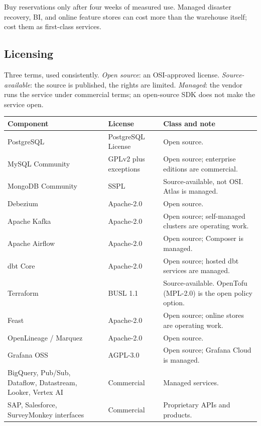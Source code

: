 \documentclass[10pt,a4paper]{article}
\begin{document}
Buy reservations only after four weeks of measured use. Managed
disaster recovery, BI, and online feature stores can cost more than the
warehouse itself; cost them as first-class services.

\subsection{Licensing}

Three terms, used consistently. \emph{Open source}: an OSI-approved
license. \emph{Source-available}: the source is published, the rights
are limited. \emph{Managed}: the vendor runs the service under
commercial terms; an open-source SDK does not make the service open.

{\small
\begin{tabularx}{\textwidth}{L{44mm}L{38mm}Y}
\toprule
\textbf{Component} & \textbf{License} & \textbf{Class and note} \\
\midrule
PostgreSQL & PostgreSQL License & Open source.\cite{postgresLicense} \\
MySQL Community & GPLv2 plus exceptions & Open source; enterprise editions are commercial.\cite{mysqlLicense} \\
MongoDB Community & SSPL & Source-available, not OSI. Atlas is managed.\cite{mongoSSPL} \\
Debezium & Apache-2.0 & Open source.\cite{debeziumLicense} \\
Apache Kafka & Apache-2.0 & Open source; self-managed clusters are operating work.\cite{kafkaLicense} \\
Apache Airflow & Apache-2.0 & Open source; Composer is managed.\cite{airflowLicense} \\
dbt Core & Apache-2.0 & Open source; hosted dbt services are managed.\cite{dbtLicense} \\
Terraform & BUSL 1.1 & Source-available. OpenTofu (MPL-2.0) is the open policy option.\cite{tfLicense,openTofuLicense} \\
Feast & Apache-2.0 & Open source; online stores are operating work.\cite{feastLicense} \\
OpenLineage / Marquez & Apache-2.0 & Open source.\cite{marquezLicense} \\
Grafana OSS & AGPL-3.0 & Open source; Grafana Cloud is managed.\cite{grafanaLicense} \\
BigQuery, Pub/Sub, Dataflow, Datastream, Looker, Vertex AI & Commercial & Managed services. \\
SAP, Salesforce, SurveyMonkey interfaces & Commercial & Proprietary APIs and products. \\
\bottomrule
\end{tabularx}
}
\end{document}
